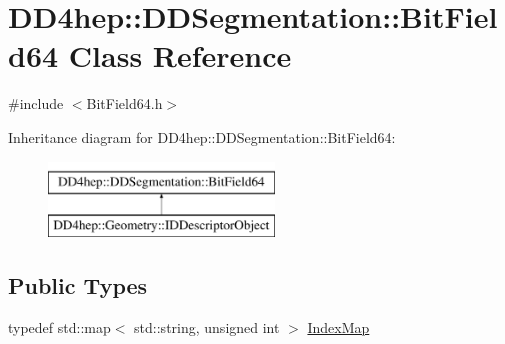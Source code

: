 \hypertarget{class_d_d4hep_1_1_d_d_segmentation_1_1_bit_field64}{}\section{D\+D4hep\+:\+:D\+D\+Segmentation\+:\+:Bit\+Field64 Class Reference}
\label{class_d_d4hep_1_1_d_d_segmentation_1_1_bit_field64}


{\ttfamily \#include $<$Bit\+Field64.\+h$>$}

Inheritance diagram for D\+D4hep\+:\+:D\+D\+Segmentation\+:\+:Bit\+Field64\+:\begin{figure}[H]
\begin{center}
\leavevmode
\includegraphics[height=2.000000cm]{class_d_d4hep_1_1_d_d_segmentation_1_1_bit_field64}
\end{center}
\end{figure}
\subsection*{Public Types}
\begin{DoxyCompactItemize}
\item 
typedef std\+::map$<$ std\+::string, unsigned int $>$ \hyperlink{class_d_d4hep_1_1_d_d_segmentation_1_1_bit_field64_a332cc613098802352470f92c7a7c71fd}{Index\+Map}
\end{DoxyCompactItemize}
